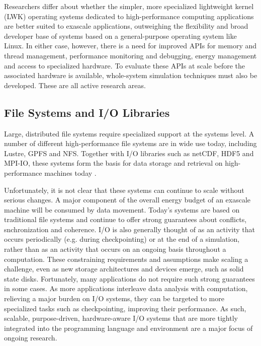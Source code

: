 \documentclass[12pt]{article}
\begin{document}
Researchers differ about whether the simpler, more specialized lightweight kernel (LWK) operating systems dedicated to high-performance computing applications are better suited to exascale applications, outweighing the flexibility and broad developer base of systems based on a general-purpose operating system like Linux. In either case, however, there is a need for improved APIs for memory and thread management, performance monitoring and debugging, energy management and access to specialized hardware. To evaluate these APIs at scale before the associated hardware is available, whole-system simulation techniques must also be developed. These are all active research areas.

\subsection{File Systems and I/O Libraries}
Large, distributed file systems require specialized support at the systems level. A number of different high-performance file systems are in wide use today, including Lustre, GPFS and NFS. Together with I/O libraries such as netCDF, HDF5 and MPI-IO, these systems form the basis for data storage and retrieval on high-performance machines today \cite{hpc-survey}. 

Unfortunately, it is not clear that these systems can continue to scale without serious changes. A major component of the overall energy budget of an exascale machine will be consumed by data movement. Today's systems are based on traditional file systems and continue to offer strong guarantees about conflicts, snchronization and coherence. I/O is also generally thought of as an activity that occurs periodically (e.g. during checkpointing) or at the end of a simulation, rather than as an activity that occurs on an ongoing basis throughout a computation. These constraining requirements and assumptions make scaling a challenge, even as new storage architectures and devices emerge, such as solid state disks. Fortunately, many applications do not require such strong guarantees in some cases. As more applications interleave data analysis with computation, relieving a major burden on I/O systems, they can be targeted to more specialized tasks such as checkpointing, improving their performance. As such, scalable, purpose-driven, hardware-aware I/O systems that are more tightly integrated into the programming language and environment are a major focus of ongoing research.
\end{document}
